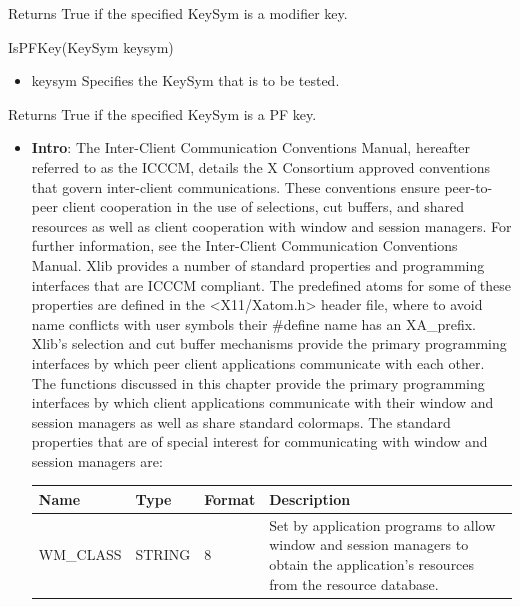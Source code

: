 \documentclass{report}
\begin{document}
\begin{itemize}
\begin{itemize}
\begin{itemize}
            \end{itemize}
            Returns True if the specified KeySym is a modifier key.
            \bigbreak \noindent 
            \begin{cppcode}
                IsPFKey(KeySym keysym)
            \end{cppcode}
            \begin{itemize}
                \item keysym Specifies the KeySym that is to be tested.
            \end{itemize}
            Returns True if the specified KeySym is a PF key.
    \end{itemize}

    \pagebreak 
    \begin{itemize}
        \item \textbf{Intro}: The Inter-Client Communication Conventions Manual, hereafter referred to as the ICCCM, details the X Consortium approved conventions that govern inter-client communications. These conventions ensure peer-to-peer client cooperation in the use of selections, cut buffers, and shared resources as well as client cooperation with window and session managers. For further information, see the Inter-Client Communication Conventions Manual.
            \bigbreak \noindent 
            Xlib provides a number of standard properties and programming interfaces that are ICCCM compliant. The predefined atoms for some of these properties are defined in the <X11/Xatom.h> header file, where to avoid name conflicts with user symbols their #define name has an XA\_prefix.
            \bigbreak \noindent 
            Xlib’s selection and cut buffer mechanisms provide the primary programming interfaces by which peer client applications communicate with each other. The functions discussed in this chapter provide the primary programming interfaces by which client applications communicate with their window and session managers as well as share standard colormaps.
            \bigbreak \noindent 
            The standard properties that are of special interest for communicating with window and session managers are:
            \begin{center}
                \begin{tabularx}{\textwidth}{@{}XllX@{}}
                    \toprule
                    \textbf{Name}& \textbf{Type}& \textbf{Format}& \textbf{Description} \\
                    \midrule
                    WM\_CLASS &STRING &8 &Set by application programs to allow window and session managers to obtain the application’s resources from the resource database.\\[2ex]

\end{tabularx}
\end{center}
\end{itemize}
\end{itemize}
\end{document}
